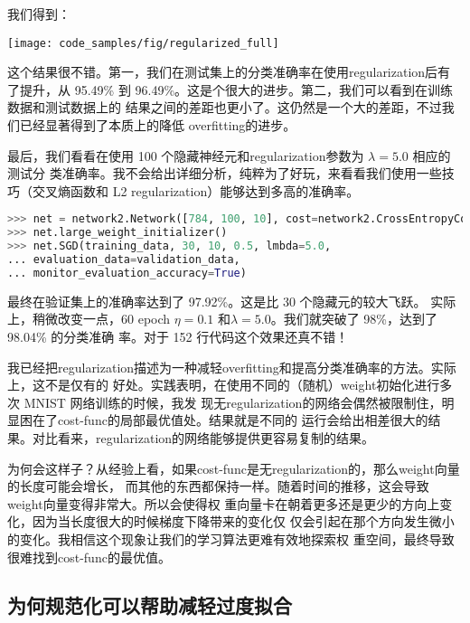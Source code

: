 我们得到：
\begin{center}
  \texttt{[image: code\_samples/fig/regularized\_full]}
\end{center}

这个结果很不错。第一，我们在测试集上的分类准确率在使用\gls*{regularization}后有了提升，从
95.49\% 到 96.49\%。这是个很大的进步。第二，我们可以看到在训练数据和测试数据上的
结果之间的差距也更小了。这仍然是一个大的差距，不过我们已经显著得到了本质上的降低
\gls*{overfitting}的进步。

最后，我们看看在使用 100 个隐藏神经元和\gls*{regularization}参数为 $\lambda = 5.0$ 相应的测试分
类准确率。我不会给出详细分析，纯粹为了好玩，来看看我们使用一些技巧（交叉熵函数和
  L2 \gls*{regularization}）能够达到多高的准确率。

\begin{lstlisting}[language=Python]
>>> net = network2.Network([784, 100, 10], cost=network2.CrossEntropyCost)
>>> net.large_weight_initializer()
>>> net.SGD(training_data, 30, 10, 0.5, lmbda=5.0,
... evaluation_data=validation_data,
... monitor_evaluation_accuracy=True)
\end{lstlisting}

最终在验证集上的准确率达到了 97.92\%。这是比 30 个隐藏元的较大飞跃。
\label{chap3_98_04_percent}实际上，稍微改变一点，60 \gls*{epoch}
$\eta=0.1$ 和$\lambda = 5.0$。我们就突破了 98\%，达到了98.04\% 的分类准确
率\label{98percent}。对于 152 行代码这个效果还真不错！

我已经把\gls*{regularization}描述为一种减轻\gls*{overfitting}和提高分类准确率的方法。实际上，这不是仅有的
好处。实践表明，在使用不同的（随机）\gls*{weight}初始化进行多次 MNIST 网络训练的时候，我发
现无\gls*{regularization}的网络会偶然被限制住，明显困在了\gls*{cost-func}的局部最优值处。结果就是不同的
运行会给出相差很大的结果。对比看来，\gls*{regularization}的网络能够提供更容易复制的结果。

为何会这样子？从经验上看，如果\gls*{cost-func}是无\gls*{regularization}的，那么\gls*{weight}向量的长度可能会增长，
而其他的东西都保持一样。随着时间的推移，这会导致\gls*{weight}向量变得非常大。所以会使得权
重向量卡在朝着更多还是更少的方向上变化，因为当长度很大的时候梯度下降带来的变化仅
仅会引起在那个方向发生微小的变化。我相信这个现象让我们的学习算法更难有效地探索权
重空间，最终导致很难找到\gls*{cost-func}的最优值。

\subsection{为何规范化可以帮助减轻过度拟合}

